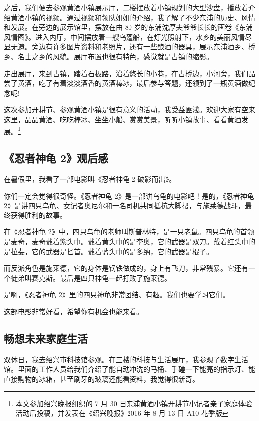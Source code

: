 \documentclass[UTF8,a4paper,titlepage,twoside,10.5pt]{article}
\begin{document}
之后，我们便去参观黄酒小镇展示厅，二楼摆放着小镇规划的大型沙盘，播放着介绍黄酒小镇的视频。通过视频和领队姐姐的介绍，我了解了不少东浦的历史、风情和发展。在旁边的展示馆里，摆放在由 80 岁的东浦沈厚夫爷爷长长的画卷《东浦风情图》。进入内厅，中间摆放着一艘乌蓬船，在灯光照射下，水乡的美丽风情尽显无遗。旁边有许多图片资料和老照片，还有一些酿酒的器具，展示东浦酒乡、桥乡、名士之乡的风貌。展厅布置也很有特色，感觉就是古镇的缩影。

走出展厅，来到古镇，踏着石板路，沿着悠长的小巷，在古桥边，小河旁，我们品尝了黄酒，吃了有着淡淡酒香的黄酒棒冰，最后参与答题，还领到了一瓶黄酒做纪念呢!

这次参加开耕节、参观黄酒小镇是很有意义的活动，我受益匪浅。欢迎大家有空来这里，品品黄酒、吃吃棒冰、坐坐小船、赏赏美景，听听小镇故事、看看黄酒发展。\footnote{本文参加绍兴晚报组织的 7 月 30 日东浦黄酒小镇开耕节小记者亲子家庭体验活动后投稿，并发表在《绍兴晚报》2016 年 8 月 13 日 A10 花季版}

\subsection{《忍者神龟 2》观后感}
\label{sec:org6bafd87}

在暑假里，我看了一部电影叫《忍者神龟 2 破影而出》。

你们一定会觉得很奇怪。《忍者神龟 2》是一部讲乌龟的电影吧！是的，《忍者神龟 2》是讲四只乌龟、女记者奥尼尔和一名司机共同抵抗大脚帮，与施莱德战斗，最终获得胜利的故事。

在《忍者神龟 2》中，四只乌龟的老师叫斯普林特，是一只老鼠。四只乌龟的首领是麦奇，麦奇戴着紫头巾。戴着黄头巾的是李奥，它的武器是双刀。戴着红头巾的是拉斐，它的武器是匕首。戴着蓝头巾的是多纳，它的武器是棍子。

而反派角色是施莱德，它的身体是钢铁做成的，身上有飞刀，非常残暴。它还有一个徒弟叫赛克斯。最后是四只神龟一起打败了施莱德。

是啊，《忍者神龟 2》里的四只神龟非常团结、有趣。我们也要学习它们。

这部电影非常好看，希望你有机会也能来看。

\subsection{畅想未来家庭生活}
\label{sec:org1855907}

双休日，我去绍兴市科技馆参观。在三楼的科技与生活展厅，我参观了数字生活馆。里面的工作人员给我们介绍了能自动冲洗的马桶、手碰一下能亮的指示灯、能直接购物的冰箱，甚至刷牙的玻璃还能看资料，我觉得很新奇。
\end{document}
